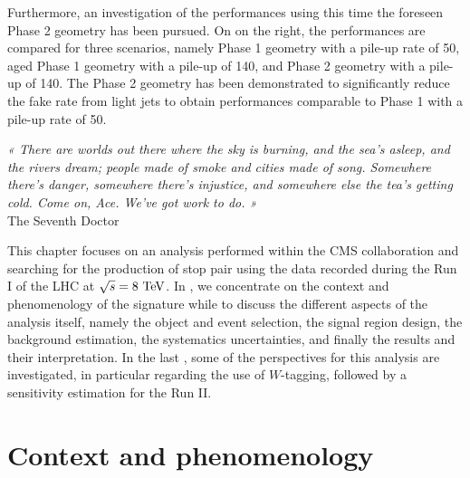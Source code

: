     Furthermore, an investigation of the performances using this time the foreseen Phase 2
    geometry has been pursued. On  on the right, the
    performances are compared for three scenarios, namely Phase 1 geometry with a pile-up
    rate of 50, aged Phase 1 geometry with a pile-up of 140, and Phase 2 geometry with
    a pile-up of 140. The Phase 2 geometry has been demonstrated to significantly reduce
    the fake rate from light jets to obtain performances comparable to Phase 1 with a
    pile-up rate of 50.

\setcounter{mtc}{5}
\vspace*{-0.7cm}
\begin{center}
\begin{minipage}{0.95\textwidth}
\emph{« There are worlds out there where the sky is burning, and the sea’s asleep, and the rivers dream;
people made of smoke and cities made of song. Somewhere there’s danger, somewhere there’s injustice,
and somewhere else the tea’s getting cold. Come on, Ace. We’ve got work to do. »}\\
\hspace*{0.75\textwidth} The Seventh Doctor
\end{minipage}
\end{center}

\minitoc
\newpage

    This chapter focuses on an analysis performed within the CMS collaboration
    and searching for the production of stop pair using the data recorded during
    the Run I of the LHC at $\sqrt{s} = 8~\text{TeV}$. In ,
    we concentrate on the context and phenomenology of the signature while
     to  discuss
    the different aspects of the analysis itself, namely the object and event selection,
    the signal region design, the background estimation, the systematics uncertainties, and
    finally the results and their interpretation. In the last ,
    some of the perspectives for this analysis are investigated, in particular regarding
    the use of $W$-tagging, followed by a sensitivity estimation for the Run II.

    \section{Context and phenomenology \label{sec:analysis_contextAndPheno}}

